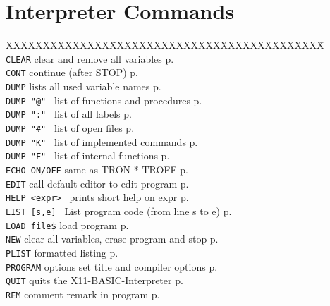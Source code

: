 \section{Interpreter Commands}

\begin{tabbing}
XXXXXXXXXXXXXX\=XXXXXXXXXXXXXXXXXXXXXXXXXXXXX\=\kill\\
\verb|CLEAR|        \> clear and remove all variables  \> p.\pageref{CLEAR}\\
\verb|CONT|         \> continue (after STOP)           \> p.\pageref{CONTINUE}\\
\verb|DUMP|	    \> lists all used variable names   \> p.\pageref{DUMP}\\
{\tt DUMP "@"	   }\> list of functions and procedures\> p.\pageref{DUMP}\\
{\tt DUMP ":"	   }\> list of all labels              \> p.\pageref{DUMP}\\
{\tt DUMP "\#"	   }\> list of open files              \> p.\pageref{DUMP}\\
{\tt DUMP "K"	   }\> list of implemented commands    \> p.\pageref{DUMP}\\
{\tt DUMP "F"	   }\> list of internal functions      \> p.\pageref{DUMP}\\
\verb|ECHO ON/OFF|  \> same as TRON * TROFF             \> p.\pageref{ECHO}\\
\verb|EDIT|	    \> call default editor to edit program\> p.\pageref{EDIT}\\
{\tt HELP <expr>   }\> prints short help on expr       \> p.\pageref{HELP}\\
{\tt LIST [s,e]	   }\> List program code (from line s to e)\> p.\pageref{LIST}\\
\verb|LOAD file$|   \> load program                     \> p.\pageref{LOAD}\\
\verb|NEW|          \> clear all variables, erase program and stop\> p.\pageref{NEW}\\
\verb|PLIST|	    \> formatted listing		  \> p.\pageref{PLIST}\\
\verb|PROGRAM| options   \>set title and compiler options \> p.\pageref{PROGRAM}\\
\verb|QUIT|         \> quits the X11-BASIC-Interpreter \> p.\pageref{QUIT}\\
\verb|REM| comment  \> remark in program                \> p.\pageref{REMbABBREVpbh}\\

\end{tabbing}
